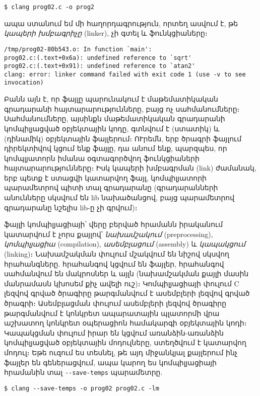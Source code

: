 \begin{verbatim}
$ clang prog02.c -o prog2
\end{verbatim}

ապա ստանում եմ մի հաղորդագրություն, որտեղ ասվում է, թե
\emph{կապերի խմբագրիչը} (linker), չի գտել  և 
ֆունկցիաները։

\begin{verbatim}
/tmp/prog02-80b543.o: In function `main':
prog02.c:(.text+0x6a): undefined reference to `sqrt'
prog02.c:(.text+0x91): undefined reference to `atan2'
clang: error: linker command failed with exit code 1 (use -v to see invocation)
\end{verbatim}

Բանն այն է, որ  ֆայլը պարունակում է մաթեմատիկական
գրադարանի հայտարարությունները, բայց ոչ սահմանումները։ Սահմանումները,
այսինքն մաթեմատիկական գրադարանի կոմպիլյացված օբյեկտային կոդը, գտնվում է
 (ստատիկ) և  (դինամիկ) օբյեկտային
ֆայլերում։ ՈՒրեմն, երբ ծրագրի ֆայլում  դիրեկտիվով
կցում ենք  ֆայլը, դա անում ենք, պարզպես, որ կոմպլյատորն
իմանա օգտագործվող ֆունկցիաների հայտարարությունները։ Իսկ կապերի խմբագրման
(link) ժամանակ, երբ պետք է ստացվի կատարվող ֆայլ, կոմպիլյատորի
 պարամետրով պիտի տալ  գրադարանը (գրադարանների
անունները սկսվում են lib նախածանցով, բայց  պարամետրով
գրադարանը նշելիս lib-ը չի գրվում)։

 ֆայլի կոմպիլյացիայի՝ վերը բերված հրամանն իրականում
կատարվում է չորս քայլով՝ \emph{նախամշակում} (preprocessing),
\emph{կոմպիլյացիա} (compilation), \emph{ասեմբլացում} (assembly) և
\emph{կապակցում} (linking)։ Նախամշակման փուլում մշակվում են \code{\#}
նիշով սկսվող հրահանգները.  հրահանգով կցվում են ֆայլեր,
 հրահանգով սահմանվում են մակրոսներ և այլն (նախամշակման
քայլի մասին մանրամասն կխոսեմ քիչ ավելի ուշ)։ Կոմպիլյացիայի փուլում C
լեզվով գրված ծրագիրը թարգմանվում է ասեմբլերի լեզվով գրված ծրագրի։
Ասեմբլացման փուլում ասեմբլերի լեզվով ծրագիրը թարգմանվում է կոնկրետ
ապարատային պլատորմի վրա աշխատող կոնկրետ օպերացիոն համակարգի օբյեկտային
կոդի։ Կապակցման փուլում իրար են կցվում առանձին-առանձին կոմպիլյացված
օբյեկտային մոդուլները, ստեղծվում է կատարվող մոդուլ։ Եթե ուզում ես
տեսնել, թե այդ միջանկյալ քայլերում ինչ ֆայլեր են գեներացվում, ապա կարող
ես կոմպիլյացիայի հրամանին տալ \verb|--save-temps| պարամետրը.

\begin{verbatim}
$ clang --save-temps -o prog02 prog02.c -lm
\end{verbatim}

